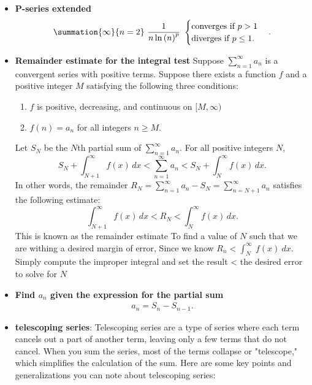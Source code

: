 \documentclass{report}
\begin{document}
\begin{itemize}
    \item \textbf{P-series extended}
        \begin{align*}
            \summation{\infty}{n=2}\ \frac{1}{n\ln{(n)}^{p}}\ 
            \begin{cases}
                \text{converges if } p>1 \\
                \text{diverges if } p \leq 1.
            \end{cases}
        .\end{align*}
    \item \textbf{Remainder estimate for the integral test}
        Suppose \( \sum_{n=1}^{\infty} a_n \)
        is a convergent series with positive terms. Suppose there exists a function \( f \) and a positive integer $M$
        satisfying the following three conditions:
        \begin{enumerate}
            \item \( f \) is positive, decreasing, and continuous on $[M,\infty)$
            \item \( f(n) = a_n \) for all integers \( n \geq M \).
        \end{enumerate}
        Let \( S_N \) be the \( N \)th partial sum of \( \sum_{n=1}^{\infty} a_n \).
        For all positive integers \( N \),
        \[
            S_N + \int_{N+1}^{\infty} f(x) \, dx < \sum_{n=1}^{\infty} a_n < S_N + \int_{N}^{\infty} f(x) \, dx.
        \]
        In other words, the remainder \( R_N = \sum_{n=1}^{\infty} a_n - S_N = \sum_{n=N+1}^{\infty} a_n \)
        satisfies the following estimate:
        \[
            \int_{N+1}^{\infty} f(x) \, dx < R_N < \int_{N}^{\infty} f(x) \, dx.
        \]
        This is known as the remainder estimate 
        \bigbreak \noindent 
        To find a value of $N$ such that we are withing a desired margin of error, Since we know $R_{n} < \int_{N}^{\infty}\ f(x)\ dx $. Simply compute the improper integral and set the result < the desired error to solve for $N$
    \item \textbf{Find $a_{n}$ given the expression for the partial sum}
        \begin{align*}
            a_{n} = S_{n} - S_{n-1}
        .\end{align*}
    \item \textbf{telescoping series}: Telescoping series are a type of series where each term cancels out a part of another term, leaving only a few terms that do not cancel. When you sum the series, most of the terms collapse or "telescope," which simplifies the calculation of the sum. Here are some key points and generalizations you can note about telescoping series:

\end{itemize}
\end{document}
